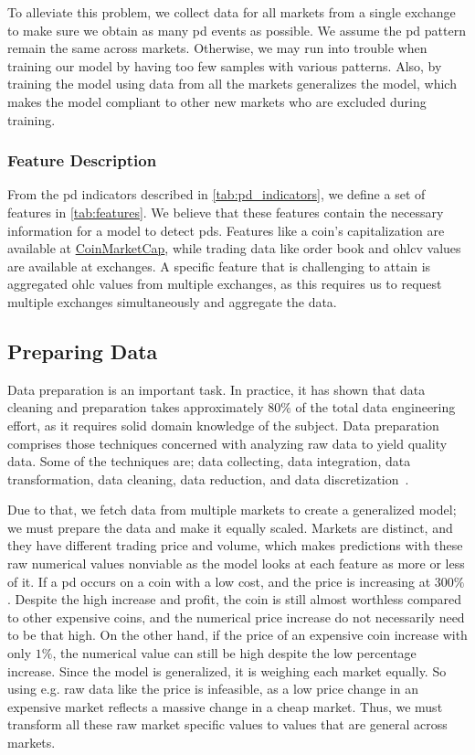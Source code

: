 To alleviate this problem, we collect data for all markets from a single exchange to make sure we obtain as many \ac{pd} events as possible. We assume the \ac{pd} pattern remain the same across markets. Otherwise, we may run into trouble when training our model by having too few samples with various patterns. Also, by training the model using data from all the markets generalizes the model, which makes the model compliant to other new markets who are excluded during training.

\subsubsection{Feature Description}
From the \ac{pd} indicators described in \autoref{tab:pd_indicators}, we define a set of features in \autoref{tab:features}. We believe that these features contain the necessary information for a model to detect \acp{pd}. Features like a coin's capitalization are available at \href{https://coinmarketcap.com/}{CoinMarketCap}, while trading data like order book and \ac{ohlcv} values are available at exchanges. A specific feature that is challenging to attain is aggregated \ac{ohlc} values from multiple exchanges, as this requires us to request multiple exchanges simultaneously and aggregate the data.



\subsection{Preparing Data}\label{sec:prep}
Data preparation is an important task. In practice, it has shown that data cleaning and preparation takes approximately $80\%$ of the total data engineering effort, as it requires solid domain knowledge of the subject. Data preparation comprises those techniques concerned with analyzing raw data to yield quality data. Some of the techniques are; data collecting, data integration, data transformation, data cleaning, data reduction, and data discretization~\cite{zhang2003data}.

Due to that, we fetch data from multiple markets to create a generalized model; we must prepare the data and make it equally scaled. Markets are distinct, and they have different trading price and volume, which makes predictions with these raw numerical values nonviable as the model looks at each feature as more or less of it. If a \ac{pd} occurs on a coin with a low cost, and the price is increasing at $300\%$. Despite the high increase and profit, the coin is still almost worthless compared to other expensive coins, and the numerical price increase do not necessarily need to be that high. On the other hand, if the price of an expensive coin increase with only $1\%$, the numerical value can still be high despite the low percentage increase. Since the model is generalized, it is weighing each market equally. So using e.g. raw data like the price is infeasible, as a low price change in an expensive market reflects a massive change in a cheap market. Thus, we must transform all these raw market specific values to values that are general across markets.

